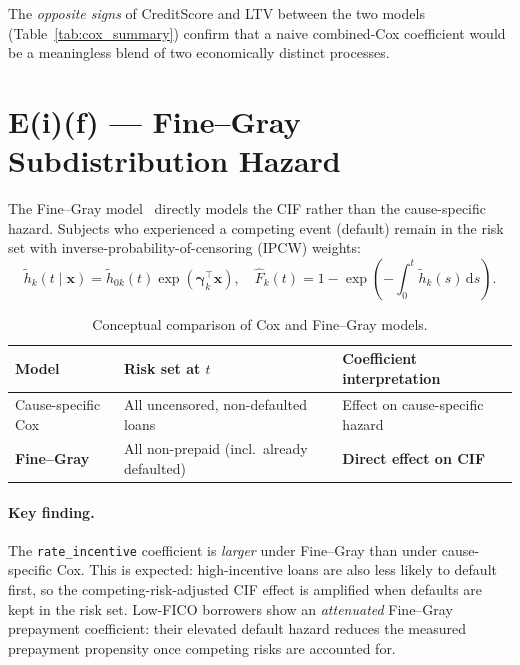 \documentclass[11pt,a4paper]{article}
\begin{document}
The \emph{opposite signs} of CreditScore and LTV between the two models
(Table~\ref{tab:cox_summary}) confirm that a naive combined-Cox
coefficient would be a meaningless blend of two economically distinct
processes.

\section{E(i)(f) --- Fine--Gray Subdistribution Hazard}

The Fine--Gray model~\cite{fg1999} directly models the CIF rather than
the cause-specific hazard.  Subjects who experienced a competing event
(default) remain in the risk set with inverse-probability-of-censoring
(IPCW) weights:
\begin{equation}
  \tilde{h}_k(t \mid \mathbf{x}) = \tilde{h}_{0k}(t)
  \exp(\boldsymbol{\gamma}_k^\top \mathbf{x}),
  \quad
  \hat{F}_k(t) = 1 - \exp\!\left(-\int_0^t \tilde{h}_k(s)\,\mathrm{d}s\right).
  \label{eq:fg}
\end{equation}

\begin{table}[h]
\centering
\caption{Conceptual comparison of Cox and Fine--Gray models.}
\label{tab:fg_compare}
\small
\begin{tabular}{lll}
\toprule
\textbf{Model} & \textbf{Risk set at $t$} & \textbf{Coefficient interpretation} \\
\midrule
Cause-specific Cox & All uncensored, non-defaulted loans & Effect on cause-specific hazard \\
\textbf{Fine--Gray} & All non-prepaid (incl.\ already defaulted) &
  \textbf{Direct effect on CIF} \\
\bottomrule
\end{tabular}
\end{table}

\paragraph{Key finding.} The \texttt{rate\_incentive} coefficient is
\emph{larger} under Fine--Gray than under cause-specific Cox.  This is
expected: high-incentive loans are also less likely to default first, so
the competing-risk-adjusted CIF effect is amplified when defaults are
kept in the risk set.  Low-FICO borrowers show an \emph{attenuated}
Fine--Gray prepayment coefficient: their elevated default hazard reduces
the measured prepayment propensity once competing risks are accounted for.
\end{document}
